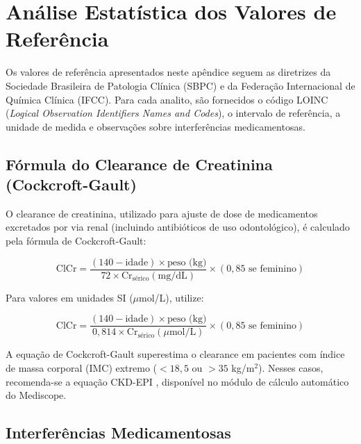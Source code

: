 
\section{Análise Estatística dos Valores de Referência}

Os valores de referência apresentados neste apêndice seguem as diretrizes da Sociedade Brasileira de Patologia Clínica (SBPC) e da Federação Internacional de Química Clínica (IFCC). Para cada analito, são fornecidos o código LOINC (\textit{Logical Observation Identifiers Names and Codes}), o intervalo de referência, a unidade de medida e observações sobre interferências medicamentosas.

\subsection{Fórmula do Clearance de Creatinina (Cockcroft-Gault)}

O clearance de creatinina, utilizado para ajuste de dose de medicamentos excretados por via renal (incluindo antibióticos de uso odontológico), é calculado pela fórmula de Cockcroft-Gault:

\begin{equation}
\text{ClCr} = \frac{(140 - \text{idade}) \times \text{peso (kg)}}{72 \times \text{Cr}_{\text{sérico}} (\text{mg/dL})} \times (0{,}85 \text{ se feminino})
\label{eq:cockcroft}
\end{equation}

Para valores em unidades SI ($\mu$mol/L), utilize:

\begin{equation}
\text{ClCr} = \frac{(140 - \text{idade}) \times \text{peso (kg)}}{0{,}814 \times \text{Cr}_{\text{sérico}} (\mu\text{mol/L})} \times (0{,}85 \text{ se feminino})
\label{eq:cockcroft_si}
\end{equation}

A equação de Cockcroft-Gault superestima o clearance em pacientes com índice de massa corporal (IMC) extremo ($<18{,}5$ ou $>35$ kg/m$^2$). Nesses casos, recomenda-se a equação CKD-EPI \cite{levens2015ckdepi}, disponível no módulo de cálculo automático do Mediscope.

\subsection{Interferências Medicamentosas}

